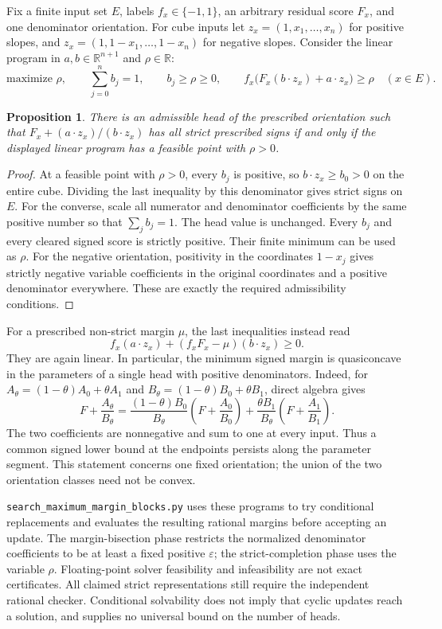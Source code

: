 \documentclass[11pt]{article}
\newtheorem{proposition}{Proposition}
\begin{document}
Fix a finite input set $E$, labels $f_x\in\{-1,1\}$, an arbitrary
residual score $F_x$, and one denominator orientation. For cube inputs
let $z_x=(1,x_1,\ldots,x_n)$ for positive slopes, and
$z_x=(1,1-x_1,\ldots,1-x_n)$ for negative slopes.
Consider the linear program in $a,b\in\mathbb R^{n+1}$ and
$\rho\in\mathbb R$:
\[
 \text{maximize }\rho,\qquad
 \sum_{j=0}^n b_j=1,\qquad b_j\geq\rho\geq0,
 \qquad f_x\bigl(F_x(b\cdot z_x)+a\cdot z_x\bigr)\geq\rho
 \quad(x\in E).
\]

\begin{proposition}
There is an admissible head of the prescribed orientation such that
$F_x+(a\cdot z_x)/(b\cdot z_x)$ has all strict prescribed signs if
and only if the displayed linear program has a feasible point with
$\rho>0$.
\end{proposition}
\begin{proof}
At a feasible point with $\rho>0$, every $b_j$ is positive, so
$b\cdot z_x\geq b_0>0$ on the entire cube. Dividing the last
inequality by this denominator gives strict signs on $E$.
For the converse, scale all numerator and denominator coefficients
by the same positive number so that $\sum_jb_j=1$. The head value
is unchanged. Every $b_j$ and every cleared signed score is
strictly positive. Their finite minimum can be used as $\rho$.
For the negative orientation, positivity in the coordinates
$1-x_j$ gives strictly negative variable coefficients in the original
coordinates and a positive denominator everywhere. These are
exactly the required admissibility conditions.
\end{proof}

For a prescribed non-strict margin $\mu$, the last inequalities instead
read
\[
 f_x(a\cdot z_x)+(f_xF_x-\mu)(b\cdot z_x)\geq0.
\]
They are again linear. In particular, the minimum signed margin is
quasiconcave in the parameters of a single head with positive
denominators. Indeed, for $A_\theta=(1-\theta)A_0+\theta A_1$ and
$B_\theta=(1-\theta)B_0+\theta B_1$, direct algebra gives
\[
 F+\frac{A_\theta}{B_\theta}
 =\frac{(1-\theta)B_0}{B_\theta}
       \left(F+\frac{A_0}{B_0}\right)
  +\frac{\theta B_1}{B_\theta}
       \left(F+\frac{A_1}{B_1}\right).
\]
The two coefficients are nonnegative and sum to one at every input.
Thus a common signed lower bound at the endpoints persists along
the parameter segment. This statement concerns one fixed orientation;
the union of the two orientation classes need not be convex.

\texttt{search\_maximum\_margin\_blocks.py} uses these programs to try
conditional replacements and evaluates the resulting rational margins
before accepting an update. The margin-bisection phase restricts the
normalized denominator coefficients to be at least a fixed positive
$\varepsilon$; the strict-completion phase uses the variable $\rho$.
Floating-point solver feasibility and infeasibility are not exact
certificates. All claimed strict representations still require the
independent rational checker. Conditional solvability does not imply
that cyclic updates reach a solution, and supplies no universal bound
on the number of heads.
\end{document}
